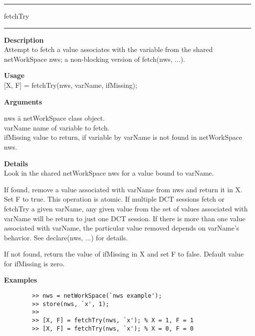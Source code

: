 \rule[0.06in]{6in}{0.01in}
\newline
fetchTry
\newline
\rule{6in}{0.01in}
\begin{list}{}{}
	\item {\bf Description}\\
	Attempt to fetch a value associates with the variable from the shared netWorkSpace nws; 
	a non-blocking version of fetch(nws, ...).
	\item {\bf Usage\\}
	[X, F] = fetchTry(nws, varName, ifMissing);
	\item {\bf Arguments}
		\begin{tabbing}
		nws	\hspace{2.5cm} \= a netWorkSpace class object. \\
		varName	\> name of variable to fetch. \\
		ifMissing \> value to return, if variable by varName is not found in netWorkSpace nws.
		\end{tabbing}
	\item {\bf Details}\\
	Look in the shared netWorkSpace nws for a value bound to varName.
 
	If found, remove a value associated with varName from nws and
	return it in X. Set F to true. This operation is atomic. If
	multiple DCT sessions fetch or fetchTry a given varName, any
	given value from the set of values associated with varName will
	be return to just one DCT session. If there is more than one
	value associated with varName, the particular value removed
	depends on varName's behavior. See declare(nws, ...) for details.
    
	If not found, return the value of ifMissing in X and set F to false.
	Default value for ifMissing is zero. 

	\item {\bf Examples}
		\begin{verbatim}
		>> nws = netWorkSpace(`nws example');
		>> store(nws, `x', 1);
		>> 
		>> [X, F] = fetchTry(nws, `x'); % X = 1, F = 1
		>> [X, F] = fetchTry(nws, `x'); % X = 0, F = 0 
		\end{verbatim}
\end{list}

